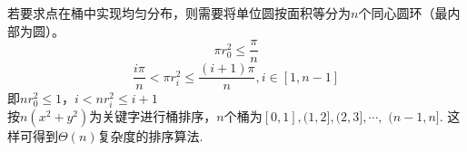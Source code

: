 \begin{solution}
    若要求点在桶中实现均匀分布，则需要将单位圆按面积等分为$n$个同心圆环（最内部为圆）。\\
    $$\pi r_0^2 \le \frac{\pi}{n}$$
    $$\frac{i\pi}{n} < \pi r_i^2 \le \frac{(i+1)\pi}{n}, i\in [1,n-1]$$
    即$ nr_0^2 \le 1$，$ i < nr_i^2 \le i+1$\\
    按$n(x^2+y^2)$为关键字进行桶排序，$n$个桶为$[0,1],(1,2],(2,3],\cdots,$ $(n-1,n]$.
    这样可得到$\Theta(n)$复杂度的排序算法.
\end{solution}
